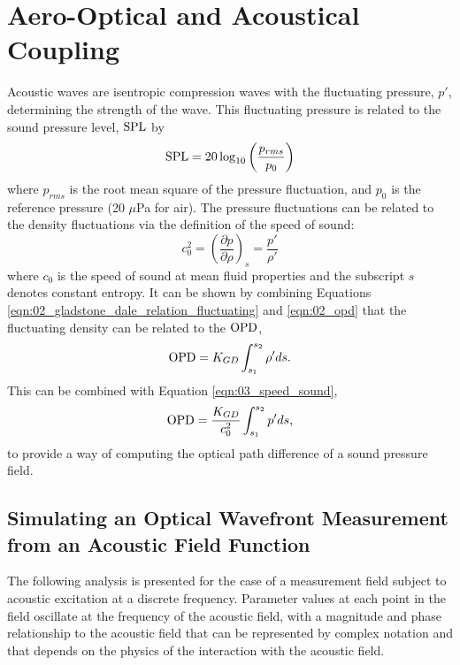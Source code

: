 
\chapter{Aero-Optical and Acoustical Coupling}
\label{chap:03_optical_acoustics}


Acoustic waves are isentropic compression waves with the fluctuating pressure, $p'$, determining the strength of the wave.
This fluctuating pressure is related to the sound pressure level, $\operatorname{SPL}$ by
\begin{equation}
  \operatorname{SPL} = 20\log_{10}\left(\frac{p_{rms}}{p_0}\right)
  \label{eqn:03_spl}
\end{equation}
where $p_{rms}$ is the root mean square of the pressure fluctuation, and $p_0$ is the reference pressure (20 $\mu$Pa for air).
The pressure fluctuations can be related to the density fluctuations via the definition of the speed of sound:
\begin{equation}
  c_0^2 = \left(\frac{\partial p}{\partial \rho}\right)_s=\frac{p'}{\rho'}
  \label{eqn:03_speed_sound}
\end{equation}
where $c_0$ is the speed of sound at mean fluid properties and the subscript $s$ denotes constant entropy.
It can be shown by combining Equations \ref{eqn:02_gladstone_dale_relation_fluctuating} and \ref{eqn:02_opd} that the fluctuating density can be related to the $\operatorname{OPD}$,
\begin{equation}
  \operatorname{OPD} = K_{GD}\int_{s_1}^{s_2}{\rho'}ds \textrm{.}
  \label{eqn:03_opd_fluct}
\end{equation}
This can be combined with Equation \ref{eqn:03_speed_sound},
\begin{equation}
  \operatorname{OPD} = \frac{K_{GD}}{c_0^2}\int_{s_1}^{s_2}{p'}ds \textrm{,}
  \label{eqn:03_opd_pressure}
\end{equation}
to provide a way of computing the optical path difference of a sound pressure field.

\section{Simulating an Optical Wavefront Measurement from an Acoustic Field Function}
\label{sect:03_simulated_beam}
The following analysis is presented for the case of a measurement field subject to acoustic excitation at a discrete frequency. Parameter values at each point in the field oscillate at the frequency of the acoustic field, with a magnitude and phase relationship to the acoustic field that can be represented by complex notation and that depends on the physics of the interaction with the acoustic field.


